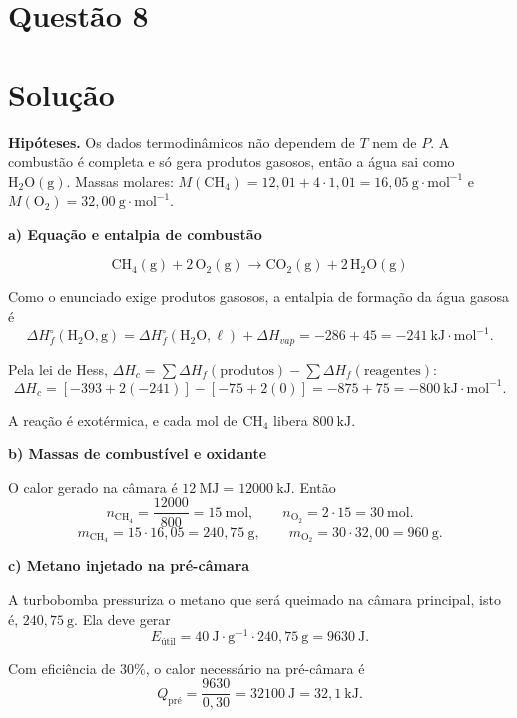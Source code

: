 \documentclass{article}%
\begin{document}
\section*{Questão 8}

\section*{Solução}

\textbf{Hipóteses.} Os dados termodinâmicos não dependem de $T$ nem de $P$. A combustão é completa e só gera produtos gasosos, então a água sai como $\mathrm{H_2O(g)}$. Massas molares: $M(\mathrm{CH_4}) = 12{,}01 + 4\cdot 1{,}01 = 16{,}05\ \mathrm{g\cdot mol^{-1}}$ e $M(\mathrm{O_2}) = 32{,}00\ \mathrm{g\cdot mol^{-1}}$.

\textbf{a) Equação e entalpia de combustão}

\[
\mathrm{CH_4(g) + 2\,O_2(g) \longrightarrow CO_2(g) + 2\,H_2O(g)}
\]

Como o enunciado exige produtos gasosos, a entalpia de formação da água gasosa é
\[
\Delta H_f^{\circ}(\mathrm{H_2O,g}) = \Delta H_f^{\circ}(\mathrm{H_2O,\ell}) + \Delta H_{vap} = -286 + 45 = -241\ \mathrm{kJ\cdot mol^{-1}}.
\]

Pela lei de Hess, $\Delta H_c = \sum \Delta H_f(\text{produtos}) - \sum \Delta H_f(\text{reagentes})$:
\[
\Delta H_c = \left[-393 + 2(-241)\right] - \left[-75 + 2(0)\right] = -875 + 75 = -800\ \mathrm{kJ\cdot mol^{-1}}.
\]

A reação é exotérmica, e cada mol de $\mathrm{CH_4}$ libera $800\ \mathrm{kJ}$.

\textbf{b) Massas de combustível e oxidante}

O calor gerado na câmara é $12\ \mathrm{MJ} = 12000\ \mathrm{kJ}$. Então
\[
n_{\mathrm{CH_4}} = \frac{12000}{800} = 15\ \mathrm{mol}, \qquad n_{\mathrm{O_2}} = 2\cdot 15 = 30\ \mathrm{mol}.
\]
\[
m_{\mathrm{CH_4}} = 15\cdot 16{,}05 = 240{,}75\ \mathrm{g}, \qquad m_{\mathrm{O_2}} = 30\cdot 32{,}00 = 960\ \mathrm{g}.
\]

\textbf{c) Metano injetado na pré-câmara}

A turbobomba pressuriza o metano que será queimado na câmara principal, isto é, $240{,}75\ \mathrm{g}$. Ela deve gerar
\[
E_{\text{útil}} = 40\ \mathrm{J\cdot g^{-1}} \cdot 240{,}75\ \mathrm{g} = 9630\ \mathrm{J}.
\]

Com eficiência de $30\%$, o calor necessário na pré-câmara é
\[
Q_{\text{pré}} = \frac{9630}{0{,}30} = 32100\ \mathrm{J} = 32{,}1\ \mathrm{kJ}.
\]
\end{document}

